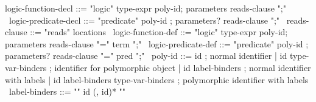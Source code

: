 \begin{syntax}
  logic-function-decl ::= "logic" type-expr poly-id;
  parameters reads-clause ";"
  \
  logic-predicate-decl ::= "predicate" poly-id ;
  parameters? reads-clause ";"
  \
  reads-clause ::= "reads" locations
  \
  logic-function-def ::= "logic" type-expr poly-id;
                         parameters {reads-clause} "=" term ";"
  \
  logic-predicate-def ::= "predicate" poly-id ;
  parameters? {reads-clause} "=" pred ";"
  \
  poly-id ::= id ; normal identifier
  | id type-var-binders ; identifier for polymorphic object
  | id label-binders ; normal identifier with labels
  | id label-binders type-var-binders ; polymorphic identifier with labels
  \
  label-binders ::= "{" id (, id)* "}"
\end{syntax}